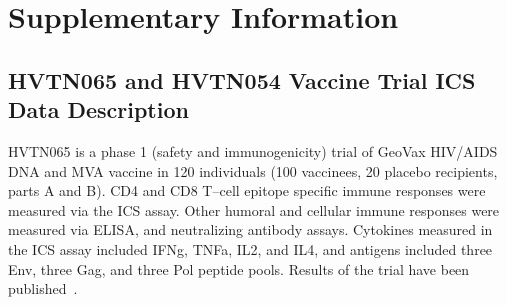 \documentclass[11pt]{article}
\begin{document}
%
%

\renewcommand{\thesection}{S.\arabic{section}}
\renewcommand{\thesubsection}{\thesection.\arabic{subsection}}
\setcounter{section}{1}
\setcounter{subsection}{0}
\renewcommand{\figurename}{Supplementary Figure}
\setcounter{figure}{0}

\section*{Supplementary Information}
\subsection{HVTN065 and HVTN054 Vaccine Trial ICS Data Description}
\label{supp:statpublished}
HVTN065 is a phase 1 (safety and immunogenicity) trial of GeoVax HIV/AIDS DNA and MVA vaccine in 120 individuals (100 vaccinees, 20 placebo recipients, parts A and B). CD4 and CD8 T--cell epitope specific immune responses were measured via the ICS assay. Other humoral and cellular immune responses were measured via ELISA, and neutralizing antibody assays. Cytokines measured in the ICS assay included IFNg, TNFa, IL2, and IL4, and antigens included three Env, three Gag, and three Pol peptide pools. Results of the trial have been published~\citep{Goonetilleke:2006jk}.
\end{document}
